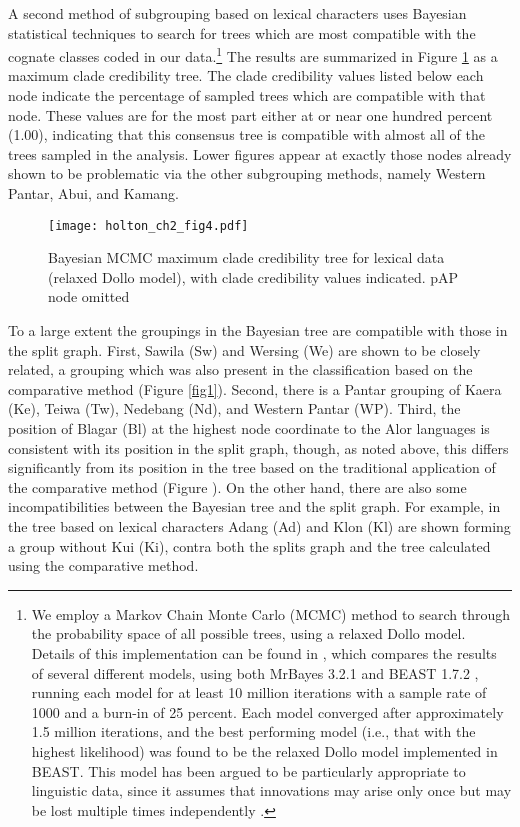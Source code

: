 A second method of subgrouping based on lexical characters uses Bayesian statistical techniques to search for trees which are most compatible with the cognate classes coded in our data.\footnote{ We employ a Markov Chain Monte Carlo (MCMC) method to search through the probability space of all possible trees, using a relaxed Dollo model. Details of this implementation can be found in \citet{RobinsonEtAl2012internal}, which compares the results of  several different models, using both MrBayes 3.2.1  \citep{RonquistEtAl2003} and BEAST 1.7.2 \citep{DrummondEtAl2012}, running each model for at least 10 million iterations with a sample rate of 1000 and a burn-in of 25 percent. Each model converged after approximately 1.5 million iterations, and the best performing model (i.e., that with the highest likelihood) was found to be the relaxed Dollo model implemented in BEAST. This model has been argued to be particularly appropriate to linguistic data, since it assumes that 
innovations may arise only once but may be lost multiple times independently \citep{Pagel2009}. } The results are summarized in Figure \ref{fig:2:bayes_mcc} as a maximum clade credibility tree. The clade credibility values listed below each node indicate the percentage of sampled trees which are compatible with that node. These values are for the most part either at or near one hundred percent (1.00), indicating that this consensus tree is compatible with almost all of the trees sampled in the analysis. Lower figures appear at exactly those nodes already shown to be problematic via the other subgrouping methods, namely Western Pantar, Abui, and Kamang. 

\begin{figure}
\texttt{[image: holton\_ch2\_fig4.pdf]}
\caption{Bayesian MCMC maximum clade credibility tree for lexical data (relaxed Dollo model), with clade credibility values indicated. pAP node omitted}
\label{fig:2:bayes_mcc}
\end{figure}

To a large extent the groupings in the Bayesian tree are compatible with those in the split graph. First, Sawila (Sw) and Wersing (We) are shown to be closely related, a grouping which was also present in the classification based on the comparative method (Figure \ref{fig1}). Second, there is a Pantar grouping of Kaera (Ke), Teiwa (Tw), Nedebang (Nd), and Western Pantar (WP). Third, the position of Blagar (Bl) at the highest node coordinate to the Alor languages is consistent with its position in the split graph, though, as noted above, this differs significantly from its position in the tree based on the traditional application of the comparative method (Figure ). On the other hand, there are also some incompatibilities between the Bayesian tree and the split graph. For example, in the tree based on lexical characters Adang (Ad) and Klon (Kl) are shown forming a group without Kui (Ki), contra both the splits graph and the tree calculated using the comparative method. 

